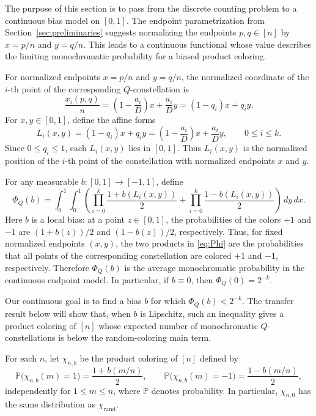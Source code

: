 \documentclass[twoside,12pt]{article}
\newcommand{\rand}{\mathrm{rand}}
\newcommand{\Prob}{\mathbb{P}}
\newcommand{\1}{\mathbf 1}
\begin{document}
The purpose of this section is to pass from the discrete counting problem to a
continuous bias model on \([0,1]\).  The endpoint parametrization from
Section~\ref{sec:preliminaries} suggests normalizing the endpoints
\(p,q\in[n]\) by \(x=p/n\) and \(y=q/n\).  This leads to a continuous
functional whose value describes the limiting monochromatic probability for a
biased product coloring.

For normalized endpoints \(x=p/n\) and \(y=q/n\), the normalized coordinate of
the \(i\)-th point of the corresponding \(Q\)-constellation is
\[
\frac{x_i(p,q)}{n}
=
\left(1-\frac{a_i}{D}\right)x+\frac{a_i}{D}y
=
(1-q_i)x+q_i y.
\]
For \(x,y\in[0,1]\), define the affine forms
\[
L_i(x,y)
=
(1-q_i)x+q_i y
=
\left(1-\frac{a_i}{D}\right)x+\frac{a_i}{D}y,
\qquad 0\le i\le k.
\]
Since \(0\le q_i\le1\), each \(L_i(x,y)\) lies in \([0,1]\).  Thus
\(L_i(x,y)\) is the normalized position of the \(i\)-th point of the
constellation with normalized endpoints \(x\) and \(y\).

For any measurable \(b:[0,1]\to[-1,1]\), define
\begin{equation}\label{eq:Phi}
\Phi_Q(b)
=
\int_0^1\!\int_0^1
\left(
\prod_{i=0}^k\frac{1+b(L_i(x,y))}{2}
+
\prod_{i=0}^k\frac{1-b(L_i(x,y))}{2}
\right)
\,dy\,dx.
\end{equation}
Here \(b\) is a local bias: at a point \(z\in[0,1]\), the probabilities of
the colors \(+1\) and \(-1\) are \((1+b(z))/2\) and \((1-b(z))/2\),
respectively.  Thus, for fixed normalized endpoints \((x,y)\), the two
products in \eqref{eq:Phi} are the probabilities that all points of the
corresponding constellation are colored \(+1\) and \(-1\), respectively.
Therefore \(\Phi_Q(b)\) is the average monochromatic probability in the
continuous endpoint model.  In particular, if \(b\equiv0\), then
\(\Phi_Q(0)=2^{-k}\).

Our continuous goal is to find a bias \(b\) for which \(\Phi_Q(b)<2^{-k}\).
The transfer result below will show that, when \(b\) is Lipschitz, such an
inequality gives a product coloring of \([n]\) whose expected number of
monochromatic \(Q\)-constellations is below the random-coloring main term.

For each \(n\), let \(\chi_{n,b}\) be the product coloring of \([n]\) defined
by
\[
\Prob\bigl(\chi_{n,b}(m)=1\bigr)
=
\frac{1+b(m/n)}{2},
\qquad
\Prob\bigl(\chi_{n,b}(m)=-1\bigr)
=
\frac{1-b(m/n)}{2},
\]
independently for \(1\le m\le n\), where \(\Prob\) denotes probability.  In
particular, \(\chi_{n,0}\) has the same distribution as \(\chi_{\rand}\).
\end{document}
